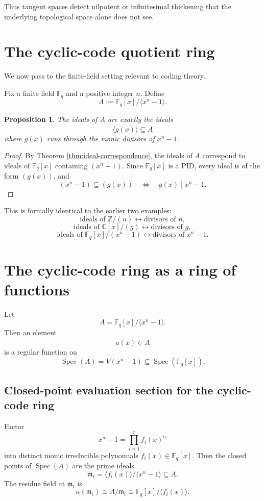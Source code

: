 \documentclass[11pt]{article}
\newtheorem{proposition}[theorem]{Proposition}
\theoremstyle{definition}
\newcommand{\Z}{\mathbb{Z}}
\newcommand{\C}{\mathbb{C}}
\newcommand{\F}{\mathbb{F}}
\newcommand{\Spec}{\operatorname{Spec}}
\newcommand{\kk}[1]{\kappa\!\left(#1\right)}
\newcommand{\ideal}[1]{\langle #1\rangle}
\newcommand{\ol}[1]{\overline{#1}}
\begin{document}
	Thus tangent spaces detect nilpotent or infinitesimal thickening that the underlying topological space alone does not see.
	
	\section{The cyclic-code quotient ring}
	
	We now pass to the finite-field setting relevant to coding theory.
	
	Fix a finite field \(\F_q\) and a positive integer \(n\). Define
	\[
	A:=\F_q[x]/\ideal{x^n-1}.
	\]
	
	\begin{proposition}\label{prop:cyclic-ring-ideals}
		The ideals of \(A\) are exactly the ideals
		\[
		\ideal{\ol{g(x)}}\subseteq A
		\]
		where \(g(x)\) runs through the monic divisors of \(x^n-1\).
	\end{proposition}
	
	\begin{proof}
		By Theorem \ref{thm:ideal-correspondence}, the ideals of \(A\) correspond to ideals of \(\F_q[x]\) containing \((x^n-1)\). Since \(\F_q[x]\) is a PID, every ideal is of the form \((g(x))\), and
		\[
		(x^n-1)\subseteq (g(x))
		\quad\Longleftrightarrow\quad
		g(x)\mid x^n-1.
		\]
	\end{proof}
	
	This is formally identical to the earlier two examples:
	\[
	\text{ideals of }\Z/(n)\leftrightarrow \text{divisors of }n,
	\]
	\[
	\text{ideals of }\C[x]/(g)\leftrightarrow \text{divisors of }g,
	\]
	\[
	\text{ideals of }\F_q[x]/(x^n-1)\leftrightarrow \text{divisors of }x^n-1.
	\]
	
	\section{The cyclic-code ring as a ring of functions}
	
	Let
	\[
	A=\F_q[x]/\ideal{x^n-1}.
	\]
	Then an element
	\[
	\ol{a(x)}\in A
	\]
	is a regular function on
	\[
	\Spec(A)=V(x^n-1)\subseteq \Spec(\F_q[x]).
	\]
	
	\subsection{Closed-point evaluation section for the cyclic-code ring}
	
	Factor
	\[
	x^n-1=\prod_{i=1}^r f_i(x)^{e_i}
	\]
	into distinct monic irreducible polynomials \(f_i(x)\in \F_q[x]\). Then the closed points of \(\Spec(A)\) are the prime ideals
	\[
	\mathfrak m_i=\ideal{f_i(x)}/\ideal{x^n-1}\subseteq A.
	\]
	The residue field at \(\mathfrak m_i\) is
	\[
	\kk{\mathfrak m_i}
	\cong
	A/\mathfrak m_i
	\cong
	\F_q[x]/\ideal{f_i(x)}.
	\]
	
\end{document}
